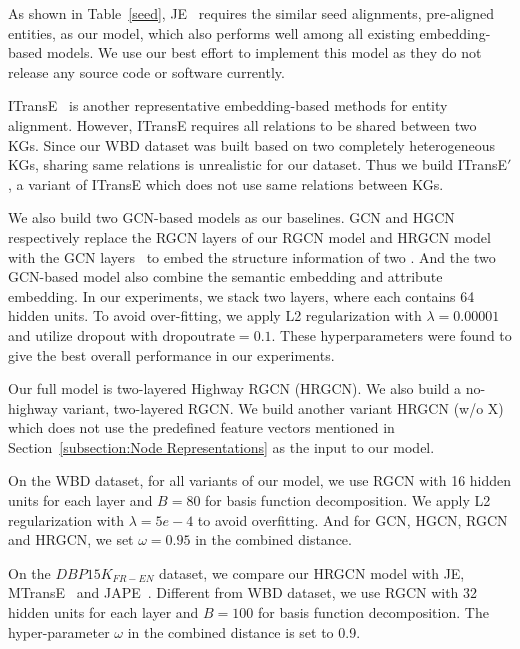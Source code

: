 	 As shown in Table~\ref{seed}, JE~\cite{hao2016joint} requires the similar seed alignments, pre-aligned entities, as our model, which also performs well among all existing embedding-based models. 
	We use our best effort to implement this model as they do not release any source code or software currently.
	
	 ITransE~\cite{zhu2017iterative} is another representative embedding-based methods for entity alignment. 
	However, ITransE requires all relations to be shared between two KGs. 
	Since our WBD dataset was built based on two completely heterogeneous KGs, sharing same relations is unrealistic for our dataset. 
	Thus we build ITransE$'$, a variant of ITransE which does not use same relations between KGs.
	
	 We also build two GCN-based models as our baselines. 
	GCN and HGCN respectively replace the RGCN layers of our RGCN model and HRGCN model with the GCN layers~\cite{Kipf2016Semi} to embed the structure information of two \KGs. 
	And the two GCN-based model also combine the semantic embedding and attribute embedding. 
	In our experiments, we stack two \GCN layers, where each \GCN contains 64 hidden units. 
	To avoid over-fitting, we apply L2 regularization with $\lambda=0.00001$ and utilize dropout with $\mathrm{dropout rate}=0.1$.
    These hyperparameters were found to give the best overall performance in our experiments.
	
	 Our full model is two-layered Highway RGCN (HRGCN). 
	We also build a no-highway variant, two-layered RGCN. 
	We build another variant HRGCN (w/o X) which does not use the predefined feature vectors mentioned in Section~\ref{subsection:Node Representations} as the input to our model.
	
	On the WBD dataset, for all variants of our model, we use RGCN with 16 hidden units for each layer and $B = 80$ for basis function decomposition. 
	We apply L2 regularization with $\lambda=5e-4$ to avoid overfitting. 
	And for GCN, HGCN, RGCN and HRGCN, we set $\omega=0.95$ in the combined distance.
	
	On the $DBP15K_{FR-EN}$ dataset, we compare our HRGCN model with JE, MTransE~\cite{chen2016multilingual} and JAPE~\cite{sun2017cross}. 
	Different from WBD dataset, we use RGCN with 32 hidden units for each layer and $B = 100$ for basis function decomposition. 
	The hyper-parameter $\omega$ in the combined distance is set to 0.9.




